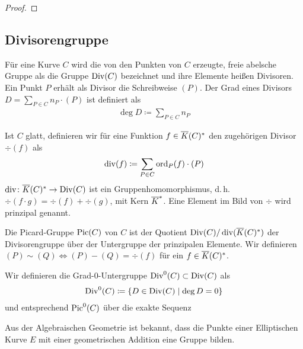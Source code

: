 \begin{Satz}
\begin{proof}
    \end{proof}


\end{Satz}


\subsection{Divisorengruppe}
\begin{Definition}[Divisorengruppe]
  Für eine Kurve $C$ wird die von den Punkten von $C$ erzeugte, freie
  abelsche Gruppe als die Gruppe $\operatorname{Div}(C)$ bezeichnet und ihre
  Elemente heißen Divisoren. Ein Punkt $P$ erhält als Divisor die
  Schreibweise $(P)$. 
  Der Grad eines Divisors $D=\sum_{P\in C}n_P\cdot(P)$ ist definiert als
  \begin{gather*}
    \deg D \coloneqq \sum_{P\in C} n_P
  \end{gather*}
  
  Ist $C$ glatt, definieren wir für eine Funktion
  $f\in\overline K(C)^*$ den zugehörigen Divisor $\div(f)$
  als
  \begin{gather*}
    \operatorname{div}(f) \coloneqq \sum_{P\in C}\operatorname{ord}_P(f)\cdot(P)
  \end{gather*}
  $\operatorname{div}\colon\overline K(C)^*\to\operatorname{Div}(C)$ ist ein Gruppenhomomorphismus,
  d.\,h. $\div(f\cdot g)=\div(f)+\div(g)$,
  mit Kern $\overline K^*$.
  Eine Element im Bild von $\div$ wird prinzipal genannt.
  
  Die Picard-Gruppe $\operatorname{Pic}(C)$ von $C$ ist der Quotient
  $\operatorname{Div}(C)/\operatorname{div}(\overline K(C)^*)$ der Divisorengruppe über der Untergruppe
  der prinzipalen Elemente. Wir definieren 
  $(P)\sim(Q)\Leftrightarrow (P)-(Q)=\div(f)$ für ein $f\in\overline K(C)^*$.

  Wir definieren die Grad-0-Untergruppe $\operatorname{Div}^0(C)\subset\operatorname{Div}(C)$ als
  \begin{gather*}
    \operatorname{Div}^0(C) \coloneqq \left\{ D\in\operatorname{Div}(C) \;\middle|\; \deg D=0 \right\}
  \end{gather*}
  und entsprechend $\operatorname{Pic}^0(C)$ über die exakte Sequenz
  \begin{center}
  \end{center}
\end{Definition}

Aus der Algebraischen Geometrie ist bekannt, dass die Punkte einer
Elliptischen Kurve $E$ mit einer geometrischen Addition eine Gruppe
bilden.

